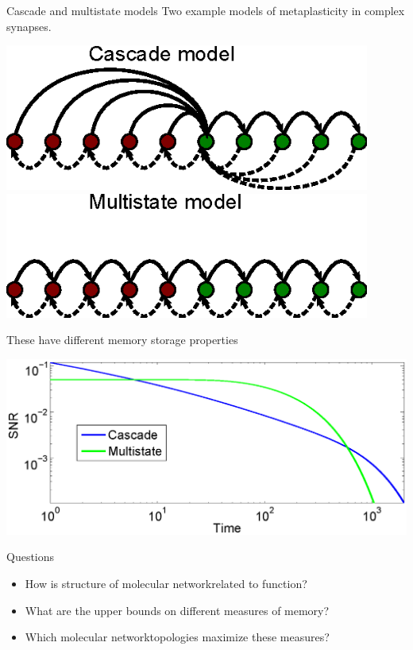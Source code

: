 \documentclass[final,hyperref={pdfpagelabels=false,bookmarks=false}]{beamer}
\newcommand{\citerr}[1]{\hfill {\footnotesize{\color{darkgrey}\cite{#1}}}}
\newcommand{\net}{molecular network}
\begin{document}
\begin{frame}{}
\begin{columns}[t]
\begin{column}{0.27\linewidth}
\begin{block}{Cascade and multistate models}
%
 Two example models of metaplasticity in complex synapses.
 \begin{center}
 \parbox[t]{30cm}{
 \includegraphics[width=12cm]{cascade.eps}
 \hspace{2cm}
 \includegraphics[width=12cm]{multistate.eps}
 }
 \end{center}
 \citerr{Fusi2005cascade,Fusi2007multistate}

 These have different memory storage properties
 \begin{center}
 \includegraphics[width=15cm]{cascms.eps}
 \end{center}
%
\end{block}



\begin{block}{Questions}
%
 \begin{itemize}
   \item How is structure of \net related to function?
   \item What are the upper bounds on different measures of memory?
   \item Which \net topologies maximize these measures?
 \end{itemize}
%
\end{block}



\end{column}
\end{columns}
\end{frame}
\end{document}
